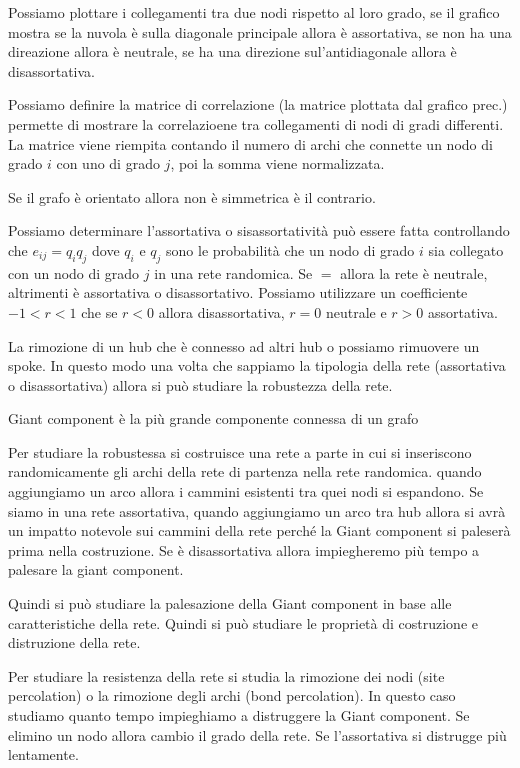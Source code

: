 Possiamo plottare i collegamenti tra due nodi rispetto al loro grado, se il grafico 
mostra se la nuvola è sulla diagonale principale allora è assortativa, se non ha una 
direazione allora è neutrale, se ha una direzione sul'antidiagonale allora è disassortativa.

Possiamo definire la matrice di correlazione (la matrice plottata dal grafico prec.) 
permette di mostrare la correlazioene tra collegamenti di nodi di gradi differenti.
La matrice viene riempita contando il numero di archi che connette un nodo di 
grado $i$ con uno di grado $j$, poi la somma viene normalizzata.

Se il grafo è orientato allora non è simmetrica è il contrario. 

Possiamo determinare l'assortativa o sisassortatività può essere fatta controllando 
che $e_{ij} = q_iq_j$ dove $q_i$ e $q_j$ sono le probabilità che un nodo di grado 
$i$ sia collegato con un nodo di grado $j$ in una rete randomica. Se $=$ allora 
la rete è neutrale, altrimenti è assortativa o disassortativo. Possiamo utilizzare 
un coefficiente $-1<r<1$ che se $r<0$ allora disassortativa, $r=0$ neutrale e $r>0$ assortativa. 

La rimozione di un hub che è connesso ad altri hub o possiamo rimuovere un spoke.
In questo modo una volta che sappiamo la tipologia della rete (assortativa o disassortativa)
allora si può studiare la robustezza della rete.

\begin{definizione}
    Giant component è la più grande componente connessa di un grafo
\end{definizione}

Per studiare la robustessa si costruisce una rete a parte in cui si inseriscono 
randomicamente gli archi della rete di partenza nella rete randomica. quando 
aggiungiamo un arco allora i cammini esistenti tra quei nodi si espandono.
Se siamo in una rete assortativa, quando aggiungiamo un arco tra hub allora si avrà
un impatto notevole sui cammini della rete perché la Giant component si paleserà
prima nella costruzione. Se è disassortativa allora impiegheremo più tempo a palesare 
la giant component.

Quindi si può studiare la palesazione della Giant component in base alle caratteristiche 
della rete. Quindi si può studiare le proprietà di costruzione e distruzione della rete.

Per studiare la resistenza della rete si studia la rimozione dei nodi (site percolation)
o la rimozione degli archi (bond percolation). In questo caso studiamo quanto tempo 
impieghiamo a distruggere la Giant component. Se elimino un nodo allora cambio il 
grado della rete. Se l'assortativa si distrugge più lentamente.


